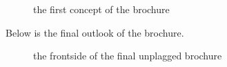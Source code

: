 \begin{figure}[!hbtp]
  \centering
  \caption{the first concept of the brochure}
  \label{fig:brochure_sketch}
\end{figure}

Below is the final outlook of the brochure.

\begin{figure}[!hbtp]
  \centering
  \caption{the frontside of the final unplagged brochure}
  \label{fig:brochure_final_frontside}
\end{figure}

